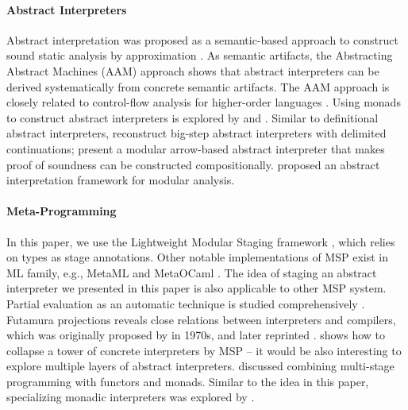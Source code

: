\paragraph{Abstract Interpreters} Abstract interpretation was proposed as a
semantic-based approach to construct sound static analysis by approximation
\cite{DBLP:conf/popl/CousotC77}. As semantic artifacts, the Abstracting Abstract
Machines (AAM) \cite{DBLP:journals/jfp/HornM12, DBLP:conf/icfp/HornM10} approach
shows that abstract interpreters can be derived systematically from concrete
semantic artifacts. The AAM approach is closely related to control-flow analysis
for higher-order languages \cite{Midtgaard:2012:CAF:2187671.2187672}.
Using monads to construct abstract interpreters is explored by
\citet{Sergey:2013:MAI:2491956.2491979} and
\citet{DBLP:journals/pacmpl/DaraisLNH17, Darais:2015:GTM:2814270.2814308}.
Similar to definitional abstract interpreters, \citet{Wei:2018:RAA:3243631.3236800}
reconstruct big-step abstract interpreters with delimited continuations;
\citet{Keidel:2018:CSP:3243631.3236767} present a modular arrow-based abstract
interpreter that makes proof of soundness can be constructed compositionally.
\citet{DBLP:conf/cc/CousotC02} proposed an abstract interpretation framework for
modular analysis.

\paragraph{Meta-Programming} In this paper, we use the Lightweight Modular
Staging framework \cite{DBLP:conf/gpce/RompfO10}, which relies on types as stage
annotations. Other notable implementations of MSP exist in ML family, e.g.,
MetaML \cite{DBLP:conf/pepm/TahaS97} and MetaOCaml
\cite{DBLP:conf/gpce/CalcagnoTHL03, DBLP:conf/flops/Kiselyov14}.
The idea of staging an abstract interpreter we presented in this paper is also
applicable to other MSP system. Partial evaluation as an automatic technique is
studied comprehensively \cite{10.1007/3-540-61580-6_11,
DBLP:books/daglib/0072559}. Futamura projections reveals close relations between
interpreters and compilers, which was originally proposed by
\citeauthor{futamura1971partial} in 1970s\cite{futamura1971partial}, and later
reprinted \cite{Futamura1999}.
\citeauthor{Amin:2017:CTI:3177123.3158140} shows how to collapse a tower of
concrete interpreters by MSP -- it would be also interesting to explore multiple
layers of abstract interpreters.
\citet{10.1007/11561347_18} discussed combining
multi-stage programming with functors and monads.
Similar to the idea in this paper, specializing monadic interpreters was
explored by \citet{DBLP:conf/dsl/SheardBP99, danvy1991compiling}.


